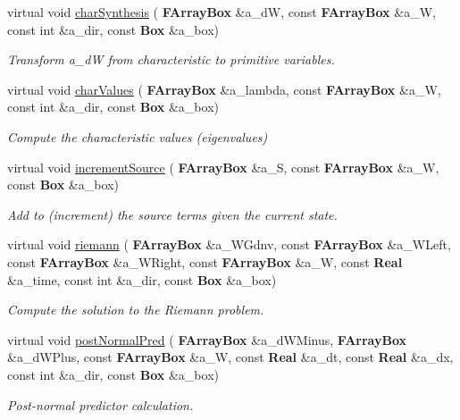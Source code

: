 \begin{DoxyCompactItemize}
virtual void \hyperlink{class_advection_physics_a8b1269b718057fe2a5d0bc8bdd183d0b}{char\+Synthesis} (\textbf{ F\+Array\+Box} \&a\+\_\+dW, const \textbf{ F\+Array\+Box} \&a\+\_\+W, const int \&a\+\_\+dir, const \textbf{ Box} \&a\+\_\+box)
\begin{DoxyCompactList}\small\item\em Transform a\+\_\+dW from characteristic to primitive variables. \end{DoxyCompactList}\item 
virtual void \hyperlink{class_advection_physics_ac3c19f3db60ae92b995ff3d0cdc3f8dc}{char\+Values} (\textbf{ F\+Array\+Box} \&a\+\_\+lambda, const \textbf{ F\+Array\+Box} \&a\+\_\+W, const int \&a\+\_\+dir, const \textbf{ Box} \&a\+\_\+box)
\begin{DoxyCompactList}\small\item\em Compute the characteristic values (eigenvalues) \end{DoxyCompactList}\item 
virtual void \hyperlink{class_advection_physics_a4fdd807a85bd6a9d1542a4d1745a4bf7}{increment\+Source} (\textbf{ F\+Array\+Box} \&a\+\_\+S, const \textbf{ F\+Array\+Box} \&a\+\_\+W, const \textbf{ Box} \&a\+\_\+box)
\begin{DoxyCompactList}\small\item\em Add to (increment) the source terms given the current state. \end{DoxyCompactList}\item 
virtual void \hyperlink{class_advection_physics_aae156d1179d03c93022e39c9a378c120}{riemann} (\textbf{ F\+Array\+Box} \&a\+\_\+\+W\+Gdnv, const \textbf{ F\+Array\+Box} \&a\+\_\+\+W\+Left, const \textbf{ F\+Array\+Box} \&a\+\_\+\+W\+Right, const \textbf{ F\+Array\+Box} \&a\+\_\+W, const \textbf{ Real} \&a\+\_\+time, const int \&a\+\_\+dir, const \textbf{ Box} \&a\+\_\+box)
\begin{DoxyCompactList}\small\item\em Compute the solution to the Riemann problem. \end{DoxyCompactList}\item 
virtual void \hyperlink{class_advection_physics_adcff7bb0c3cf117a51836754921ea75a}{post\+Normal\+Pred} (\textbf{ F\+Array\+Box} \&a\+\_\+d\+W\+Minus, \textbf{ F\+Array\+Box} \&a\+\_\+d\+W\+Plus, const \textbf{ F\+Array\+Box} \&a\+\_\+W, const \textbf{ Real} \&a\+\_\+dt, const \textbf{ Real} \&a\+\_\+dx, const int \&a\+\_\+dir, const \textbf{ Box} \&a\+\_\+box)
\begin{DoxyCompactList}\small\item\em Post-\/normal predictor calculation. \end{DoxyCompactList}\item 

\end{DoxyCompactItemize}
